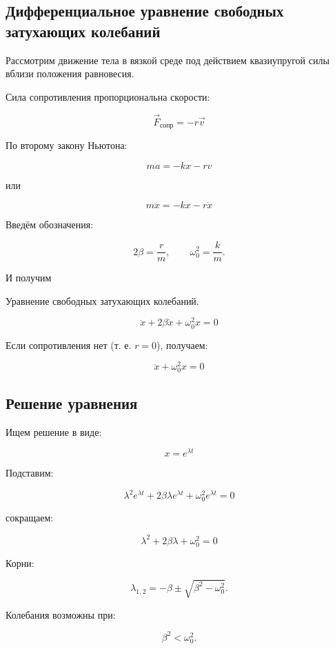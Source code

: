 \documentclass[a4paper,12pt]{article}
\begin{document}
\subsection*{Дифференциальное уравнение свободных затухающих колебаний}

Рассмотрим движение тела в вязкой среде под действием квазиупругой силы вблизи положения равновесия.

Сила сопротивления пропорциональна скорости:

\[
\vec{F}_{\text{сопр}} = -r \vec{v}
\]

По второму закону Ньютона:

\[
ma = -kx - rv
\]

или

\[
m\ddot{x} = -kx - r\dot{x}
\]

Введём обозначения:

\[
2\beta = \frac{r}{m},
\qquad
\omega_0^2 = \frac{k}{m}.
\]

И получим

\begin{theorembox}
Уравнение свободных затухающих колебаний.

\[
\ddot{x} + 2\beta \dot{x} + \omega_0^2 x = 0
\]


\end{theorembox}

 



Если сопротивления нет (т. е. $r=0$), получаем:

\[
\ddot{x} + \omega_0^2 x = 0
\] 

\subsection*{Решение уравнения}

Ищем решение в виде:

\[
x = e^{\lambda t}
\]

Подставим:

\[
\lambda^2 e^{\lambda t} + 2\beta \lambda e^{\lambda t} + \omega_0^2 e^{\lambda t} = 0
\]

сокращаем:

\[
\lambda^2 + 2\beta \lambda + \omega_0^2 = 0
\]

Корни:

\[
\lambda_{1,2} = -\beta \pm \sqrt{\beta^2 - \omega_0^2}.
\]

Колебания возможны при:

\[
\beta^2 < \omega_0^2.
\]
\end{document}
